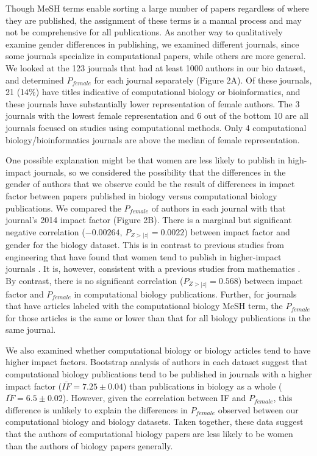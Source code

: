\documentclass[10pt,letterpaper]{article}
\begin{document}
\begin{flushleft}
Though MeSH terms enable sorting a large number of papers regardless of where they are published, the assignment of these terms is a manual process and may not be comprehensive for all publications. As another way to qualitatively examine gender differences in publishing, we examined different journals, since some journals specialize in computational papers, while others are more general. We looked at the 123  journals that had at least 1000 authors in our bio dataset, and determined $P_{female}$ for each journal separately (Figure 2A). Of these journals, 21 (14\%) have titles indicative of computational biology or bioinformatics, and these journals have substantially lower representation of female authors. The 3 journals with the lowest female representation and 6 out of the bottom 10 are all journals focused on studies using computational methods. Only 4 computational biology/bioinformatics journals are above the median of female representation.

One possible explanation might be that women are less likely to publish in high-impact journals, so we considered the possibility that the differences in the gender of authors that we observe could be the result of differences in impact factor between papers published in biology versus computational biology publications. We compared the $P_{female}$ of authors in each journal with that journal’s 2014 impact factor (Figure 2B). There is a marginal but significant negative correlation ($-0.00264$, $P_{Z > |z|} = 0.0022$) between impact factor and gender for the biology dataset. This is in contrast to previous studies from engineering that have found that women tend to publish in higher-impact journals \cite{Ghiasi2015}. It is, however, consistent with a previous studies from mathematics . By contrast, there is no significant correlation ($P_{Z > |z|} = 0.568$) between impact factor and $P_{female}$ in computational biology publications. Further, for journals that have articles labeled with the computational biology MeSH term, the $P_{female}$ for those articles is the same or lower than that for all biology publications in the same journal.

We also examined whether computational biology or biology articles tend to have higher impact factors. Bootstrap analysis of authors in each dataset suggest that computational biology publications tend to be published in journals with a higher impact factor ($\bar{IF} = 7.25 \pm 0.04$) than publications in biology as a whole ($\bar{IF} = 6.5 \pm 0.02$). However, given the correlation between IF and $P_{female}$, this difference is unlikely to explain the differences in $P_{female}$ observed between our computational biology and biology datasets. Taken together, these data suggest that the authors of computational biology papers are less likely to be women than the authors of biology papers generally.


\end{flushleft}
\end{document}
